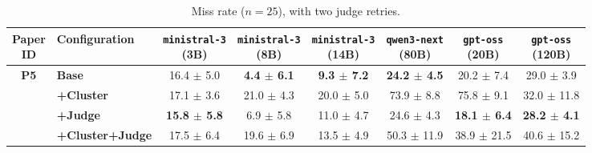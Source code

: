 \begin{table}[htbp]
    \centering
    \small
    \setlength{\tabcolsep}{4pt}
    \caption{Miss rate ($n=25$), with two judge retries.}
    \begin{tabular}{c|l|cccccc}
        \toprule
        \makecell{\textbf{Paper} \\ \textbf{ID}} & \textbf{Configuration}& \makecell{\texttt{ministral-3} \\ (3B)} & \makecell{\texttt{ministral-3} \\ (8B)} & \makecell{\texttt{ministral-3} \\ (14B)} & \makecell{\texttt{qwen3-next} \\ (80B)} & \makecell{\texttt{gpt-oss} \\ (20B)} & \makecell{\texttt{gpt-oss} \\ (120B)} \\
        \hline
        
        \multirow{4}{*}{\textbf{P5}} 
          & \textbf{Base}& 16.4 $\pm$ 5.0 & \textbf{4.4 $\pm$ 6.1} & \textbf{9.3 $\pm$ 7.2} & \textbf{24.2 $\pm$ 4.5} & 20.2 $\pm$ 7.4 & 29.0 $\pm$ 3.9 \\
          & \textbf{+Cluster}& 17.1 $\pm$ 3.6 & 21.0 $\pm$ 4.3 & 20.0 $\pm$ 5.0 & 73.9 $\pm$ 8.8 & 75.8 $\pm$ 9.1 & 32.0 $\pm$ 11.8 \\
          & \textbf{+Judge}& \textbf{15.8 $\pm$ 5.8} & 6.9 $\pm$ 5.8 & 11.0 $\pm$ 4.7 & 24.6 $\pm$ 4.3 & \textbf{18.1 $\pm$ 6.4} & \textbf{28.2 $\pm$ 4.1} \\
          & \textbf{+Cluster+Judge}& 17.5 $\pm$ 6.4 & 19.6 $\pm$ 6.9 & 13.5 $\pm$ 4.9 & 50.3 $\pm$ 11.9 & 38.9 $\pm$ 21.5 & 40.6 $\pm$ 15.2 \\
        \hline
        
        \bottomrule
    \end{tabular}
    \label{tab:miss_rate_p5}
\end{table}